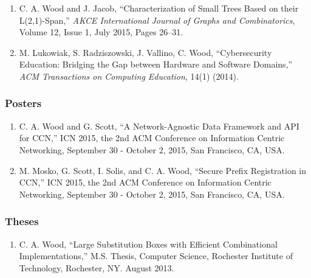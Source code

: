 \documentclass[10pt]{res} %
\begin{document}
\begin{resume}
\begin{enumerate}[J-1.]
\item C. A. Wood and J. Jacob, ``Characterization of Small Trees Based on their L(2,1)-Span,'' \emph{AKCE International Journal of Graphs and Combinatorics}, Volume 12, Issue 1, July 2015, Pages 26–31.

\item M. Lukowiak, S. Radziszowski, J. Vallino, C. Wood, ``Cybersecurity Education: Bridging the Gap between Hardware and Software Domains,'' \emph{ACM Transactions on Computing Education}, 14(1) (2014).

\end{enumerate}

\vspace{-15pt}
\subsubsection*{Posters}
\begin{enumerate}[P-1.]
	\item C. A. Wood and G. Scott, ``A Network-Agnostic Data Framework and API for CCN,'' ICN 2015, the 2nd ACM Conference on Information Centric Networking, September 30 - October 2, 2015, San Francisco, CA, USA.

	\item M. Mosko, G. Scott, I. Solis, and C. A. Wood, ``Secure Prefix Registration in CCN,'' ICN 2015, the 2nd ACM Conference on Information Centric Networking, September 30 - October 2, 2015, San Francisco, CA, USA.
\end{enumerate}

\vspace{-15pt}
\subsubsection*{Theses}
\begin{enumerate}[D-1.]
	\item C. A. Wood, ``Large Substitution Boxes with Efficient Combinational Implementations,'' M.S. Thesis, Computer Science, Rochester Institute of Technology, Rochester, NY. August 2013.
\end{enumerate}



\end{resume}
\end{document}
